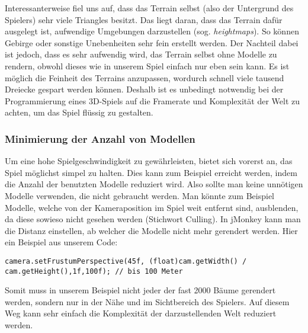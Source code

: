 Interessanterweise fiel uns auf, dass das Terrain selbst (also der Untergrund des Spielers) sehr viele Triangles besitzt. Das liegt daran, dass das Terrain dafür ausgelegt ist, aufwendige Umgebungen darzustellen (sog. \emph{heightmaps}). So können Gebirge oder sonstige Unebenheiten sehr fein erstellt werden. Der Nachteil dabei ist jedoch, dass es sehr aufwendig wird, das Terrain selbst ohne Modelle zu rendern, obwohl dieses wie in unserem Spiel einfach nur eben sein kann. Es ist möglich die Feinheit des Terrains anzupassen, wordurch schnell viele tausend Dreiecke gespart werden können. Deshalb ist es unbedingt notwendig bei der Programmierung eines 3D-Spiels auf die Framerate und Komplexität der Welt zu achten, um das Spiel flüssig zu gestalten.



\subsubsection{Minimierung der Anzahl von Modellen}
Um eine hohe Spielgeschwindigkeit zu gewährleisten, bietet sich vorerst an, das Spiel möglichst simpel zu halten. Dies kann zum Beispiel erreicht werden, indem die Anzahl der benutzten Modelle reduziert wird. Also sollte man keine unnötigen Modelle verwenden, die nicht gebraucht werden. Man könnte zum Beispiel Modelle, welche von der Kameraposition im Spiel weit entfernt sind, ausblenden, da diese sowieso nicht gesehen werden (Stichwort Culling). In jMonkey kann man die Distanz einstellen, ab welcher die Modelle nicht mehr gerendert werden. Hier ein Beispiel aus unserem Code:


\begin{lstlisting}
camera.setFrustumPerspective(45f, (float)cam.getWidth() / cam.getHeight(),1f,100f); // bis 100 Meter
\end{lstlisting}


Somit muss in unserem Beispiel nicht jeder der fast 2000 Bäume gerendert werden, sondern nur in der Nähe und im Sichtbereich des Spielers. Auf diesem Weg kann sehr einfach die Komplexität der darzustellenden Welt reduziert werden.

